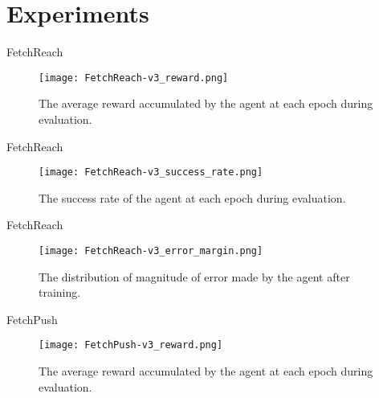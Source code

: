 \section{Experiments}

\begin{frame}{FetchReach}
    \begin{figure}
        \centering
        \texttt{[image: FetchReach-v3\_reward.png]}
        \caption{The average reward accumulated by the agent at each epoch during evaluation.}
    \end{figure}
\end{frame}

\begin{frame}{FetchReach}
    \begin{figure}
        \centering
        \texttt{[image: FetchReach-v3\_success\_rate.png]}
        \caption{The success rate of the agent at each epoch during evaluation.}
    \end{figure}
\end{frame}

\begin{frame}{FetchReach}
    \begin{figure}
        \centering
        \texttt{[image: FetchReach-v3\_error\_margin.png]}
        \caption{The distribution of magnitude of error made by the agent after training.}
    \end{figure}
\end{frame}

\begin{frame}{FetchPush}
    \begin{figure}
        \centering
        \texttt{[image: FetchPush-v3\_reward.png]}
        \caption{The average reward accumulated by the agent at each epoch during evaluation.}
    \end{figure}
\end{frame}
